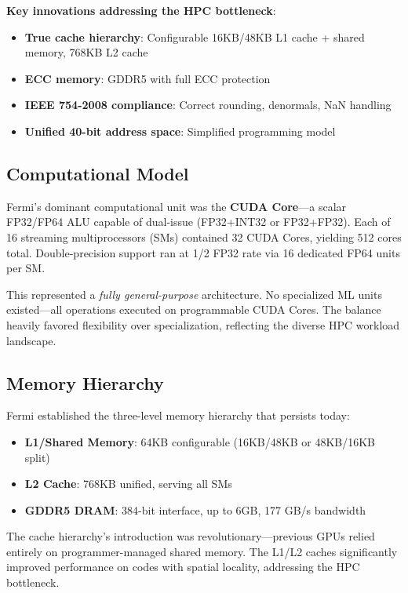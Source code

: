 \documentclass{article}
\begin{document}
\textbf{Key innovations addressing the HPC bottleneck}:
\begin{itemize}
\item \textbf{True cache hierarchy}: Configurable 16KB/48KB L1 cache + shared memory, 768KB L2 cache
\item \textbf{ECC memory}: GDDR5 with full ECC protection
\item \textbf{IEEE 754-2008 compliance}: Correct rounding, denormals, NaN handling
\item \textbf{Unified 40-bit address space}: Simplified programming model
\end{itemize}

\subsection{Computational Model}

Fermi's dominant computational unit was the \textbf{CUDA Core}—a scalar FP32/FP64 ALU capable of dual-issue (FP32+INT32 or FP32+FP32). Each of 16 streaming multiprocessors (SMs) contained 32 CUDA Cores, yielding 512 cores total. Double-precision support ran at 1/2 FP32 rate via 16 dedicated FP64 units per SM.

This represented a \textit{fully general-purpose} architecture. No specialized ML units existed—all operations executed on programmable CUDA Cores. The balance heavily favored flexibility over specialization, reflecting the diverse HPC workload landscape.

\subsection{Memory Hierarchy}

Fermi established the three-level memory hierarchy that persists today:
\begin{itemize}
\item \textbf{L1/Shared Memory}: 64KB configurable (16KB/48KB or 48KB/16KB split)
\item \textbf{L2 Cache}: 768KB unified, serving all SMs
\item \textbf{GDDR5 DRAM}: 384-bit interface, up to 6GB, 177 GB/s bandwidth
\end{itemize}

The cache hierarchy's introduction was revolutionary—previous GPUs relied entirely on programmer-managed shared memory. The L1/L2 caches significantly improved performance on codes with spatial locality, addressing the HPC bottleneck.
\end{document}
